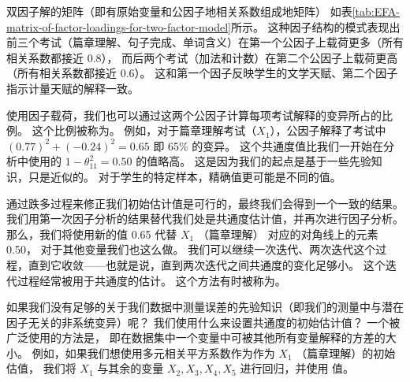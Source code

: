 双因子解的矩阵（即有原始变量和公因子地相关系数组成地矩阵）
如表\ref{tab:EFA-matrix-of-factor-loadings-for-two-factor-model}所示。
这种因子结构的模式表现出前三个考试（篇章理解、句子完成、单词含义）在第一个公因子上载荷更多（所有相关系数都接近 0.8），
而后两个考试（加法和计数）在第二个公因子上载荷更高（所有相关系数都接近 0.6）。
这和第一个因子反映学生的文学天赋、第二个因子指示计量天赋的解释一致。


\begin{table}
    \centering
\end{table}

使用因子载荷，我们也可以通过这两个公因子计算每项考试解释的变异所占的比例。
这个比例被称为。
例如，对于篇章理解考试（$ X_1 $），公因子解释了考试中 $ (0.77)^2 + (-0.24)^2 = 0.65 $ 即 65\% 的变异。
这个共通度值比我们一开始在分析中使用的 $ 1 - \theta_{11}^2 = 0.50 $ 的值略高。
这是因为我们的起点是基于一些先验知识，只是近似的。
对于学生的特定样本，精确值更可能是不同的值。

通过跌多过程来修正我们初始估计值是可行的，最终我们会得到一个一致的结果。
我们用第一次因子分析的结果替代我们处是共通度估计值，并再次进行因子分析。
那么，我们将使用新的值 0.65 代替 $ X_1 $ （篇章理解） 对应的对角线上的元素 0.50，
对于其他变量我们也这么做。
我们可以继续一次迭代、两次迭代这个过程，直到它收敛——也就是说，直到两次迭代之间共通度的变化足够小。
这个迭代过程经常被用于共通度的估计。
这个方法有时被称为。

如果我们没有足够的关于我们数据中测量误差的先验知识（即我们的测量中与潜在因子无关的非系统变异）呢？
我们使用什么来设置共通度的初始估计值？
一个被广泛使用的方法是，
即在数据集中一个变量中可被其他所有变量解释的方差的大小。
例如，如果我们想使用多元相关平方系数作为作为 $ X_1 $ （篇章理解）的初始估值，
我们将 $ X_1 $ 与其余的变量 $ X_2, X_3, X_4, X_5 $ 进行回归，并使用 \rsquare 值。

